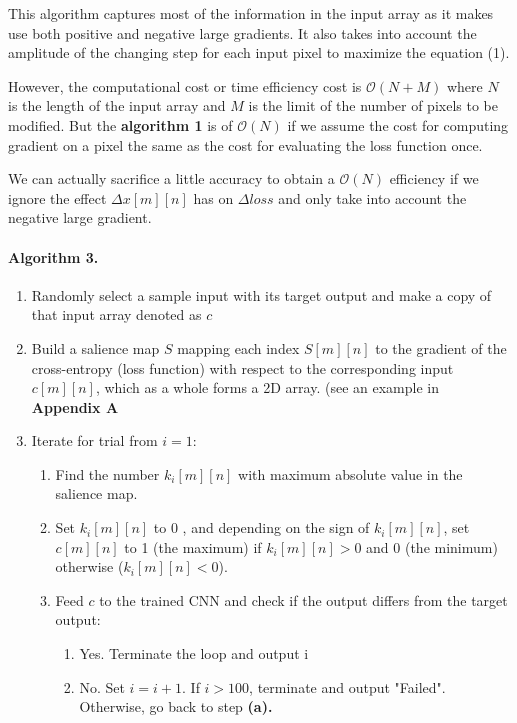 \documentclass{article}
\begin{document}
This algorithm captures most of the information in the input array as it makes use both positive and negative large gradients. It also takes into account the amplitude of the changing step for each input pixel to maximize the equation (1).

However, the computational cost or time efficiency cost is $\mathcal{O}(N+M)$ where $N$ is the length of the input array and $M$ is the limit of the number of pixels to be modified. 
But the \textbf{algorithm 1} is of $\mathcal{O}(N)$ if we assume the cost for computing gradient on a pixel the same as the cost for evaluating the loss function once.

We can actually sacrifice a little accuracy to obtain a $\mathcal{O}(N)$ efficiency if we ignore the effect $\Delta x[m][n]$ has on $\Delta loss$ and only take into account the negative large gradient.

\paragraph{Algorithm 3.}
\begin{enumerate}
\item Randomly select a sample input with its target output and make a copy of that input array denoted as $c$

\item Build a salience map $S$ mapping each index $S[m][n]$ to the gradient of the cross-entropy (loss function) with respect to the corresponding input $c[m][n]$, which as a whole forms a 2D array. (see an example in \textbf{Appendix A}

\item Iterate for trial from $i=1$:

\begin{enumerate}
	\item Find the number $k_i[m][n]$ with maximum absolute value in the salience map.

	\item Set $k_i[m][n]$ to 0 , and depending on the sign of $k_i[m][n]$, set $c[m][n]$ to 1 (the maximum) if $k_i[m][n] > 0$ and 0 (the minimum) otherwise ($k_i[m][n] < 0$).

	\item Feed $c$ to the trained CNN and check if the output differs from the target output:
		\begin{enumerate}
			\item Yes. Terminate the loop and output i
			\item No. Set $i=i+1$. If $i > 100$, terminate and output "Failed". Otherwise, go back to step \textbf{(a).}
		\end{enumerate}
\end{enumerate}
\end{enumerate}
\end{document}
